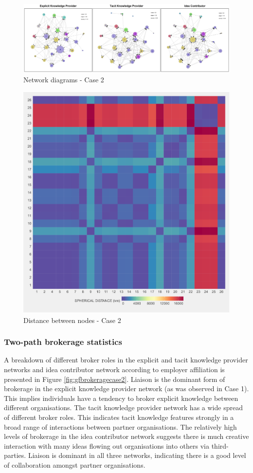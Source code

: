 \begin{landscape}
	\begin{figure}
		\centering
		\includegraphics[width=1.0\linewidth]{Images/thesis_networks_case2}
		\caption{Network diagrams - Case 2}
		\label{fig:thesisnetworkscase3}
	\end{figure}
\end{landscape}



\begin{figure}
	\centering
	\includegraphics[width=0.7\linewidth]{Images/sph_distance_case2}
	\caption{Distance between nodes - Case 2}
	\label{fig:sphdistancecase2}
\end{figure}

\subsubsection{Two-path brokerage statistics}

A breakdown of different broker roles in the explicit and tacit knowledge provider networks and idea contributor network according to employer affiliation is presented in Figure \ref{fig:gfbrokeragecase2}. Liaison is the dominant form of brokerage in the explicit knowledge provider network (as was observed in Case 1). This implies individuals have a tendency to broker explicit knowledge between different organisations. The tacit knowledge provider network has a wide spread of different broker roles. This indicates tacit knowledge features strongly in a broad range of interactions between partner organisations. The relatively high levels of brokerage in the idea contributor network suggests there is much creative interaction with many ideas flowing out organisations into others via third-parties. Liaison is dominant in all three networks, indicating there is a good level of collaboration amongst partner organisations. \medskip 

